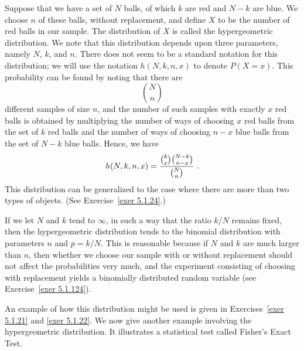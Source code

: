 Suppose that we have a set of $N$ balls, of which $k$ are red and $N-k$ are blue.  We
choose $n$ of these balls, without replacement, and define $X$ to be the number of red
balls in our sample.  The distribution of $X$ is called the hypergeometric
distribution.  We note that this distribution depends upon three parameters, namely
$N$, $k$, and $n$.  There does not seem to be a standard notation for this
distribution; we will use the notation $h(N, k, n, x)$ to denote $P(X = x)$.  This
probability can be found by noting that there are
$${N \choose n}$$ different samples of size $n$, and the number of such samples with
exactly $x$ red balls is obtained by multiplying the number of ways of choosing $x$
red balls from the set of $k$ red balls and the number of ways of choosing $n-x$ blue
balls from the set of $N-k$ blue balls.  Hence, we have
$$h(N, k, n, x) = {{{{k}\choose{x}}{{N-k}\choose{n-x}}}\over{{{N}\choose{n}}}}\ .$$ 
This distribution can be generalized to the case where there are more than two types
of objects.  (See  Exercise~\ref{exer 5.1.24}.)
\par 
If we let $N$ and $k$ tend to $\infty$, in such a way that the ratio
$k/N$ remains fixed, then the hypergeometric distribution tends to the binomial
distribution with parameters $n$ and $p = k/N$.  This is reasonable because if $N$ and
$k$ are much larger than $n$, then whether we choose our sample with or without
replacement should not affect the probabilities very much, and the experiment
consisting of choosing with replacement yields a binomially distributed random
variable  (see Exercise~\ref{exer 5.1.124}).
\par An example of how this distribution might be used is given in Exercises~\ref{exer
5.1.21} and
\ref{exer 5.1.22}.  We now give another example involving the hypergeometric
distribution.  It illustrates a statistical test called Fisher's Exact Test.
